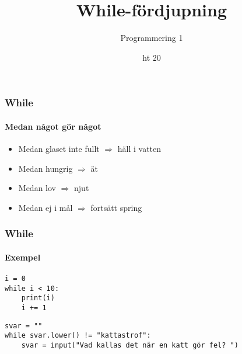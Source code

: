 \documentclass{beamer}
\begin{document}

\title{While-fördjupning}
\date{ht 20}
\author{Programmering 1}

\maketitle

\begin{frame}[fragile]
\frametitle{While}
\framesubtitle{Medan något gör något}

\begin{itemize}
\item Medan glaset inte fullt $\Rightarrow$ häll i vatten
\item Medan hungrig $\Rightarrow$ ät
\item Medan lov $\Rightarrow$ njut
\item Medan ej i mål $\Rightarrow$ fortsätt spring
\end{itemize}

\end{frame}

\begin{frame}[fragile]
\frametitle{While}
\framesubtitle{Exempel}

\begin{lstlisting}
i = 0
while i < 10:
    print(i)
    i += 1
\end{lstlisting}

\pause

\begin{lstlisting}
svar = ""
while svar.lower() != "kattastrof":
    svar = input("Vad kallas det när en katt gör fel? ")
\end{lstlisting}

\end{frame}
\end{document}
